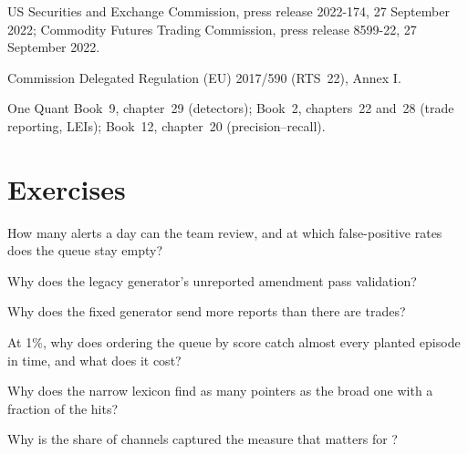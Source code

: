\begin{omsources}
\item US Securities and Exchange Commission, press release 2022-174, 27 September 2022; Commodity Futures Trading Commission, press release
8599-22, 27 September 2022.
\item Commission Delegated Regulation (EU) 2017/590 (RTS~22), Annex I.
\item One Quant Book~9, chapter~29 (detectors); Book~2, chapters~22 and~28 (trade reporting, LEIs); Book~12, chapter~20 (precision--recall).
\end{omsources}

\section{Exercises}

\begin{exercise}[$\star$]\label{exo:pl:surveillance-and-compliance-technology:1}
How many alerts a day can the team review, and at which false-positive rates does the queue stay empty?
\end{exercise}

\begin{exercise}[$\star$]\label{exo:pl:surveillance-and-compliance-technology:2}
Why does the legacy generator's unreported amendment pass validation?
\end{exercise}

\begin{exercise}[$\star$]\label{exo:pl:surveillance-and-compliance-technology:3}
Why does the fixed generator send more reports than there are trades?
\end{exercise}

\begin{exercise}[$\star\star$]\label{exo:pl:surveillance-and-compliance-technology:4}
At 1\%, why does ordering the queue by score catch almost every planted episode in time, and what does it cost?
\end{exercise}

\begin{exercise}[$\star\star$]\label{exo:pl:surveillance-and-compliance-technology:5}
Why does the narrow lexicon find as many pointers as the broad one with a fraction of the hits?
\end{exercise}

\begin{exercise}[$\star\star$]\label{exo:pl:surveillance-and-compliance-technology:6}
Why is the share of channels captured the measure that matters for ?
\end{exercise}

